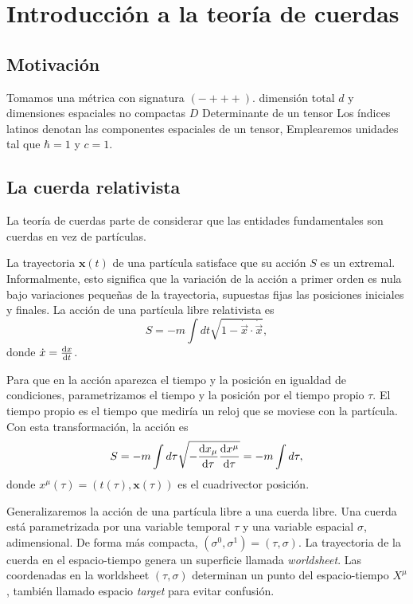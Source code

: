 \chapter{Introducción a la teoría de cuerdas}


\section{Motivación}




Tomamos una métrica con signatura $(-+++)$.
dimensión total $d$ y dimensiones espaciales no compactas $D$
Determinante de un tensor
Los índices latinos denotan las componentes espaciales de un tensor,
Emplearemos unidades tal que $\hbar = 1$ y $c=1$.

\section{La cuerda relativista}


La teoría de cuerdas parte de considerar que las entidades fundamentales son cuerdas
en vez de partículas. 

La trayectoria $\mathbf x(t)$ de una partícula satisface que su acción $S$ es un extremal.
Informalmente, esto significa que la variación de la acción a primer orden es nula bajo
variaciones pequeñas de la trayectoria, supuestas fijas las posiciones iniciales y finales.
La acción de una partícula libre relativista es
\begin{equation}
  S=-m\int dt \sqrt{1-\dot {\vec{x}} \cdot \dot {\vec{x}}},
\end{equation}
donde $\dot x = \dv{x}{t}$.

Para que en la acción aparezca el tiempo y la posición en igualdad de condiciones,
parametrizamos el tiempo y la posición por el tiempo propio $\tau$. 
El tiempo propio es el tiempo que mediría un reloj que se moviese con la partícula.
Con esta transformación, la acción es
\begin{equation}
 S = -m\int d\tau \sqrt{-\dv{x_\mu}{\tau}\dv{x^\mu}{\tau}}=-m\int d\tau,
\end{equation}
donde $x^\mu(\tau)=(t(\tau),\mathbf x(\tau))$ es el cuadrivector posición.

Generalizaremos la acción de una partícula libre a una cuerda libre.
Una cuerda está parametrizada por una variable temporal $\tau$ y una variable espacial $\sigma$, adimensional.
De forma más compacta, $(\sigma^0,\sigma^1)=(\tau,\sigma)$. 
La trayectoria de la cuerda en el espacio-tiempo genera un superficie llamada \emph{worldsheet}.
Las coordenadas en la worldsheet $(\tau,\sigma)$ determinan un punto del espacio-tiempo $X^\mu$, también llamado
espacio \emph{target} para evitar confusión.

